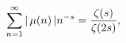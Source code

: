 \[\sum_{n=1}^{\infty}|\mathop{\mu\/}\nolimits\!\left(n\right)|n^{-s}=\frac{%
\mathop{\zeta\/}\nolimits\!\left(s\right)}{\mathop{\zeta\/}\nolimits\!\left(2s%
\right)},\]